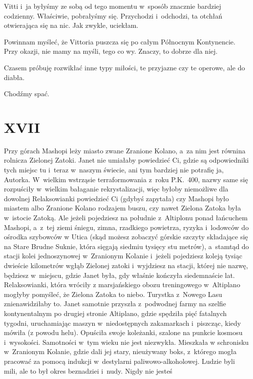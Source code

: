 \documentclass[oneside,polish,12pt,sfheadings]{mwbk}
\begin{document}
Vitti i~ja byłyśmy ze sobą od tego momentu w~sposób znacznie bardziej
codzienny. Właściwie, pobrałyśmy się. Przychodzi i~odchodzi, ta otchłań
otwierająca się na nic. Jak zwykle, uciekłam.

Powinnam myśleć, że Vittoria puszcza się po całym Północnym Kontynencie.
Przy okazji, nie mamy na myśli, tego co wy. Znaczy, to dobrze dla
niej.

Czasem próbuję rozwikłać inne typy miłości, te przyjazne czy te operowe,
ale do diabła.

Chodźmy spać.

\chapter{XVII}

Przy górach Mashopi leży miasto zwane Zranione Kolano, a~za nim jest
równina rolnicza Zielonej Zatoki. Janet nie umiałaby powiedzieć Ci,
gdzie są odpowiedniki tych miejsc tu i~teraz w~naszym świecie, ani
tym bardziej nie potrafię ja, Autorka. W~wielkim wstrząsie terraformowania
z~roku P.K.~400, nazwy same się rozpuściły w~wielkim bałaganie rekrystalizacji,
więc byłoby niemożliwe dla dowolnej Relaksowianki powiedzieć Ci (gdybyś
zapytała) czy Mashopi było miastem albo Zranione Kolano rodzajem buszu,
czy nawet Zielona Zatoka była w~istocie Zatoką. Ale jeżeli pojedziesz
na południe z~Altiplonu ponad łańcuchem Mashopi, a~z~tej ziemi śniegu,
zimna, rzadkiego powietrza, ryzyka i~lodowców do ośrodka szybowców
w Utica (skąd możesz zobaczyć górskie szczyty składające się na Stare
Brudne Suknie, która sięgają siedmiu tysięcy stu metrów), a~stamtąd
do stacji kolei jednoszynowej w~Zranionym Kolanie i~jeżeli pojedziesz
koleją tysiąc dwieście kilometrów wgłąb Zielonej zatoki i~wyjdziesz
na stacji, której nie nazwę, będziesz w~miejscu, gdzie Janet była,
gdy właśnie kończyła siedemnaście lat. Relaksowianki, która wróciły
z marsjańskiego obozu treningowego w~Altiplano mogłyby pomyśleć, że
Zielona Zatoka to niebo. Turystka z~Nowego Lasu znienawidziłaby to.
Janet samotnie przyszła z~podwodnej farmy na szelfie kontynentalnym
po drugiej stronie Altiplano, gdzie spędziła pięć fatalnych tygodni,
uruchamiając maszyn w~niedostępnych zakamarkach i~piszcząc, kiedy
mówiła (z powodu helu). Opuściła swoje koleżanki, szalone na punkcie
kosmosu i~wysokości. Samotności w~tym wieku nie jest niezwykła. Mieszkała
w schronisku w~Zranionym Kolanie, gdzie dali jej stary, nieużywany
boks, z~którego mogła pracować za pomocą indukcji w~destylarni paliwowo-alkoholowej.
Ludzie byli mili, ale to był okres beznadziei i~nudy. Nigdy nie jesteś
\end{document}
